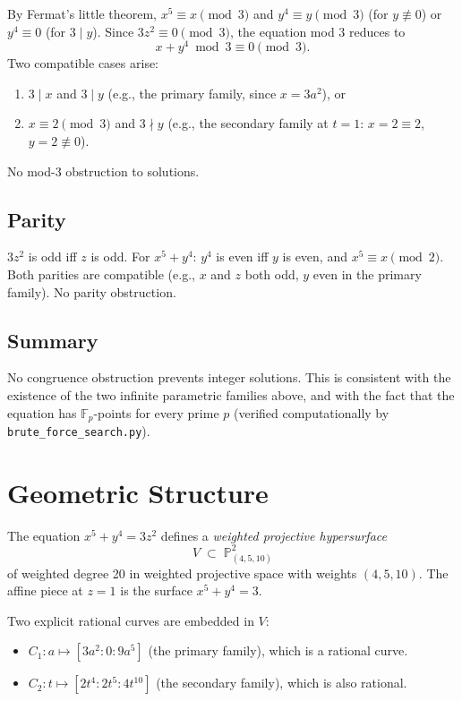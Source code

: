 \documentclass[12pt,a4paper]{article}
\theoremstyle{definition}
\begin{document}
By Fermat's little theorem, $x^5 \equiv x \pmod{3}$ and $y^4 \equiv y \pmod{3}$
(for $y \not\equiv 0$) or $y^4 \equiv 0$ (for $3 \mid y$).
Since $3z^2 \equiv 0 \pmod 3$, the equation mod 3 reduces to
\[
  x + y^4\bmod{3} \equiv 0 \pmod{3}.
\]
Two compatible cases arise:
\begin{enumerate}
  \item $3 \mid x$ and $3 \mid y$ (e.g., the primary family, since $x = 3a^2$), or
  \item $x \equiv 2 \pmod{3}$ and $3 \nmid y$ (e.g., the secondary family at $t=1$: $x = 2 \equiv 2$, $y = 2 \not\equiv 0$).
\end{enumerate}
No mod-3 obstruction to solutions.

\subsection{Parity}

$3z^2$ is odd iff $z$ is odd.  For $x^5 + y^4$: $y^4$ is even iff $y$ is even,
and $x^5 \equiv x \pmod{2}$.  Both parities are compatible (e.g., $x$ and $z$ both odd,
$y$ even in the primary family).  No parity obstruction.

\subsection{Summary}

No congruence obstruction prevents integer solutions.  This is consistent with the
existence of the two infinite parametric families above, and with the fact that the
equation has $\mathbb{F}_p$-points for every prime $p$ (verified computationally by
\texttt{brute\_force\_search.py}).

\section{Geometric Structure}\label{sec:geometry}

The equation $x^5 + y^4 = 3z^2$ defines a \emph{weighted projective hypersurface}
\[
  V \;\subset\; \mathbb{P}^2_{(4,5,10)}
\]
of weighted degree 20 in weighted projective space with weights $(4, 5, 10)$.  The affine
piece at $z=1$ is the surface $x^5 + y^4 = 3$.

Two explicit rational curves are embedded in $V$:
\begin{itemize}
  \item $C_1 \colon a \mapsto [3a^2 : 0 : 9a^5]$ (the primary family), which is a rational curve.
  \item $C_2 \colon t \mapsto [2t^4 : 2t^5 : 4t^{10}]$ (the secondary family), which is also rational.
\end{itemize}
\end{document}
